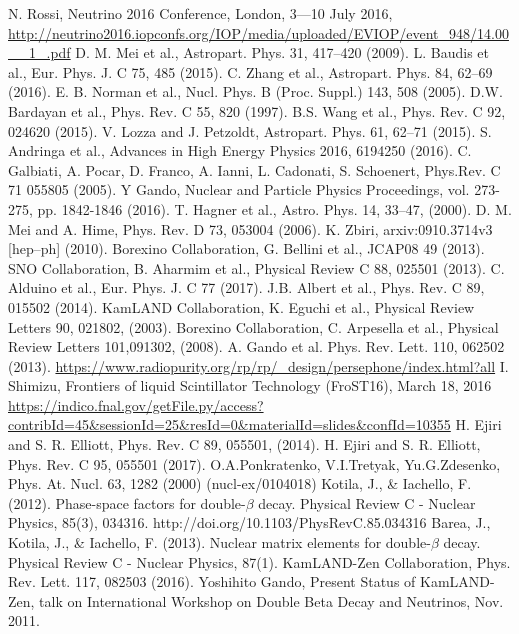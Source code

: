 \documentclass[11pt,prd,letterpaper,amsmath,amssymb,final,nofootinbib
,unsortedaddress,superscriptaddress
]{revtex4-1}
\begin{document}
\begin{thebibliography}{00}
 N. Rossi, Neutrino 2016 Conference, London, 3---10 July 2016, \url{http://neutrino2016.iopconfs.org/IOP/media/uploaded/EVIOP/event_948/14.00__1_.pdf}
 D. M. Mei et al., Astropart. Phys. 31, 417–420 (2009).
 L. Baudis et al., Eur. Phys. J. C 75, 485 (2015).
 C. Zhang et al., Astropart. Phys. 84, 62--69 (2016).
 E. B. Norman et al., Nucl. Phys. B (Proc. Suppl.) 143, 508 (2005).
 D.W. Bardayan et al., Phys. Rev. C 55, 820 (1997).
 B.S. Wang et al., Phys. Rev. C 92, 024620 (2015).
  V. Lozza and J. Petzoldt, Astropart. Phys. 61, 62--71 (2015).
 S. Andringa et al., Advances in High Energy Physics 2016, 6194250 (2016).
 C. Galbiati, A. Pocar, D. Franco, A. Ianni, L. Cadonati, S. Schoenert, Phys.Rev. C 71 055805 (2005).
 Y Gando, Nuclear and Particle Physics Proceedings, vol. 273- 275, pp. 1842-1846 (2016).
 T. Hagner et al., Astro. Phys. 14, 33--47, (2000).
 D. M. Mei and A. Hime, Phys. Rev. D 73, 053004 (2006).
 K. Zbiri, arxiv:0910.3714v3 [hep--ph] (2010).
 Borexino Collaboration, G. Bellini et al., JCAP08 49 (2013).
 SNO Collaboration, B. Aharmim et al., Physical Review C 88, 025501 (2013).
 C. Alduino et al., Eur. Phys. J. C 77 (2017).
  J.B. Albert et al., Phys. Rev. C 89, 015502 (2014). 
 KamLAND Collaboration, K. Eguchi et al., Physical Review Letters 90, 021802, (2003).
 Borexino Collaboration, C. Arpesella et al., Physical Review Letters 101,091302, (2008).
 A. Gando et al. Phys. Rev. Lett. 110, 062502 (2013).
 \url{https://www.radiopurity.org/rp/rp/_design/persephone/index.html?all}
 I. Shimizu, Frontiers of liquid Scintillator Technology (FroST16), March 18, 2016
\url{https://indico.fnal.gov/getFile.py/access?contribId=45&sessionId=25&resId=0&materialId=slides&confId=10355}
 H. Ejiri and S. R. Elliott, Phys. Rev. C 89, 055501, (2014).
 H. Ejiri and S. R. Elliott, Phys. Rev. C 95, 055501 (2017).
 O.A.Ponkratenko, V.I.Tretyak, Yu.G.Zdesenko, Phys. At. Nucl. 63, 1282   (2000)  (nucl-ex/0104018)
 Kotila, J., \& Iachello, F. (2012). Phase-space factors for double-$\beta$ decay. Physical Review C - Nuclear Physics, 85(3), 034316. http://doi.org/10.1103/PhysRevC.85.034316
 Barea, J., Kotila, J., \& Iachello, F. (2013). Nuclear matrix elements for double-$\beta$ decay. Physical Review C - Nuclear Physics, 87(1).
 KamLAND-Zen Collaboration, Phys. Rev. Lett. 117, 082503 (2016).
 Yoshihito Gando, Present Status of KamLAND-Zen, talk on International Workshop on Double Beta Decay and Neutrinos, Nov. 2011.
\end{thebibliography}




\end{document}
